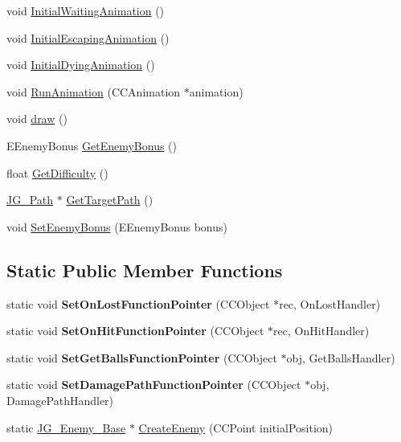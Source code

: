 \begin{DoxyCompactItemize}
void \hyperlink{class_j_g___enemy___base_addc7dc8e7ee789b629a442b63a61f205}{Initial\-Waiting\-Animation} ()
\item 
void \hyperlink{class_j_g___enemy___base_a6dd7be9c41d58787a6bb2b461b4fa343}{Initial\-Escaping\-Animation} ()
\item 
void \hyperlink{class_j_g___enemy___base_a793996b953546bd76ab1483e8d62ed65}{Initial\-Dying\-Animation} ()
\item 
void \hyperlink{class_j_g___enemy___base_a6754c7a2a6fc9f2877f57c6a868706d8}{Run\-Animation} (C\-C\-Animation $\ast$animation)
\item 
void \hyperlink{class_j_g___enemy___base_a4ab46247bd7d721286c3196f8fcdbf3a}{draw} ()
\item 
E\-Enemy\-Bonus \hyperlink{class_j_g___enemy___base_af71160543647fad96886e1f87b580896}{Get\-Enemy\-Bonus} ()
\item 
float \hyperlink{class_j_g___enemy___base_a3b1c2a3166cd9dbd3aefc79542f36d16}{Get\-Difficulty} ()
\item 
\hyperlink{class_j_g___path}{J\-G\-\_\-\-Path} $\ast$ \hyperlink{class_j_g___enemy___base_a8ce8d53876f32eea86ed76d6448d5791}{Get\-Target\-Path} ()
\item 
void \hyperlink{class_j_g___enemy___base_afd08277de6792e48a0c33edaada7ca42}{Set\-Enemy\-Bonus} (E\-Enemy\-Bonus bonus)
\end{DoxyCompactItemize}
\subsection*{Static Public Member Functions}
\begin{DoxyCompactItemize}
\item 
\hypertarget{class_j_g___enemy___base_aa9057195c83084f43facd26cd26c2bcc}{static void {\bfseries Set\-On\-Lost\-Function\-Pointer} (C\-C\-Object $\ast$rec, On\-Lost\-Handler)}\label{class_j_g___enemy___base_aa9057195c83084f43facd26cd26c2bcc}

\item 
\hypertarget{class_j_g___enemy___base_ac3fa895795c80fa6b5213bdb136bcb83}{static void {\bfseries Set\-On\-Hit\-Function\-Pointer} (C\-C\-Object $\ast$rec, On\-Hit\-Handler)}\label{class_j_g___enemy___base_ac3fa895795c80fa6b5213bdb136bcb83}

\item 
\hypertarget{class_j_g___enemy___base_a1e3731cde597d162b35e2df1a57bbd45}{static void {\bfseries Set\-Get\-Balls\-Function\-Pointer} (C\-C\-Object $\ast$obj, Get\-Balls\-Handler)}\label{class_j_g___enemy___base_a1e3731cde597d162b35e2df1a57bbd45}

\item 
\hypertarget{class_j_g___enemy___base_a6df960380bf013523c12062d91227bcd}{static void {\bfseries Set\-Damage\-Path\-Function\-Pointer} (C\-C\-Object $\ast$obj, Damage\-Path\-Handler)}\label{class_j_g___enemy___base_a6df960380bf013523c12062d91227bcd}

\item 
static \hyperlink{class_j_g___enemy___base}{J\-G\-\_\-\-Enemy\-\_\-\-Base} $\ast$ \hyperlink{class_j_g___enemy___base_a928a5124a9a1dbf000c7b1d6b357b960}{Create\-Enemy} (C\-C\-Point initial\-Position)
\end{DoxyCompactItemize}
